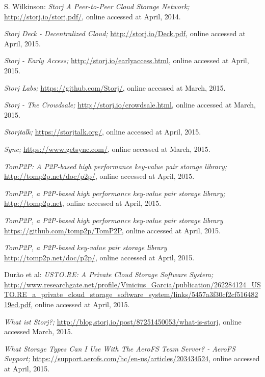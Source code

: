 \begin{thebibliography}{99}
		S. Wilkinson:
		\emph{Storj A Peer-to-Peer Cloud Storage Network;}
		\url{http://storj.io/storj.pdf/},
		online accessed at April, 2014.
		
		\emph{Storj Deck - Decentralized Cloud;}
		\url{http://storj.io/Deck.pdf},
		online accessed at April, 2015.

		\emph{Storj - Early Access;}
		\url{http://storj.io/earlyaccess.html},
		online accessed at April, 2015.
		
		\emph{Storj Labs;}
		\url{https://github.com/Storj/},
		online accessed at March, 2015.
		
		\emph{Storj - The Crowdsale;}
		\url{http://storj.io/crowdsale.html},
		online accessed at March, 2015.
		
		\emph{Storjtalk;}
		\url{https://storjtalk.org/},
		online accessed at April, 2015.
		
		\emph{Sync;}
		\url{https://www.getsync.com/},
		online accessed at March, 2015.

		\emph{TomP2P: A P2P-based high performance key-value pair storage library;}
		\url{http://tomp2p.net/doc/p2p/},
		online accessed at April, 2015.		

		\emph{TomP2P, a P2P-based high performance key-value pair storage library;}
		\url{http://tomp2p.net},
		online accessed at April, 2015.

		\emph{TomP2P, a P2P-based high performance key-value pair storage library}
		\url{https://github.com/tomp2p/TomP2P},
		online accessed at April, 2015.

		\emph{TomP2P, a P2P-based key-value pair storage library}
		\url{http://tomp2p.net/doc/p2p/},
		online accessed at April, 2015.

		Dur\~ao et al:
		\emph{USTO.RE: A Private Cloud Storage Software System;}
		\url{http://www.researchgate.net/profile/Vinicius_Garcia/publication/262284124_USTO.RE_a_private_cloud_storage_software_system/links/5457a3f30cf2cf51648219ed.pdf},
		online accessed at April, 2015.

		\emph{What ist Storj?;}
		\url{http://blog.storj.io/post/87251450053/what-is-storj},
		online accessed March, 2015.

		\emph{What Storage Types Can I Use With The AeroFS Team Server? - AeroFS Support;}
		\url{https://support.aerofs.com/hc/en-us/articles/203434524},
		online accessed at April, 2015.

\end{thebibliography}